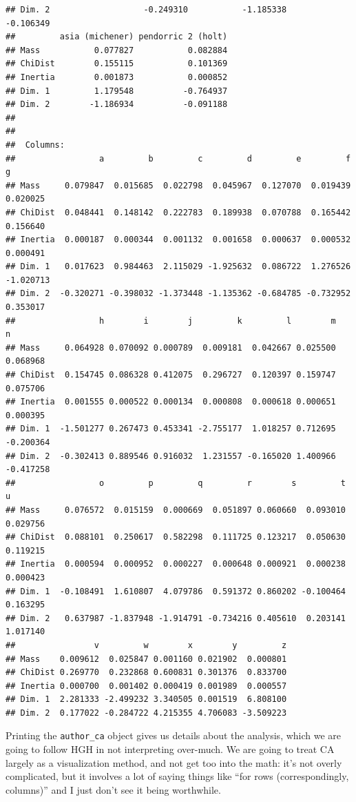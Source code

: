 \documentclass[
]{book}
\begin{document}
\begin{verbatim}
## Dim. 2                   -0.249310           -1.185338          -0.106349
##         asia (michener) pendorric 2 (holt)
## Mass           0.077827           0.082884
## ChiDist        0.155115           0.101369
## Inertia        0.001873           0.000852
## Dim. 1         1.179548          -0.764937
## Dim. 2        -1.186934          -0.091188
## 
## 
##  Columns:
##                 a         b         c         d         e         f         g
## Mass     0.079847  0.015685  0.022798  0.045967  0.127070  0.019439  0.020025
## ChiDist  0.048441  0.148142  0.222783  0.189938  0.070788  0.165442  0.156640
## Inertia  0.000187  0.000344  0.001132  0.001658  0.000637  0.000532  0.000491
## Dim. 1   0.017623  0.984463  2.115029 -1.925632  0.086722  1.276526 -1.020713
## Dim. 2  -0.320271 -0.398032 -1.373448 -1.135362 -0.684785 -0.732952  0.353017
##                 h        i        j         k         l        m         n
## Mass     0.064928 0.070092 0.000789  0.009181  0.042667 0.025500  0.068968
## ChiDist  0.154745 0.086328 0.412075  0.296727  0.120397 0.159747  0.075706
## Inertia  0.001555 0.000522 0.000134  0.000808  0.000618 0.000651  0.000395
## Dim. 1  -1.501277 0.267473 0.453341 -2.755177  1.018257 0.712695 -0.200364
## Dim. 2  -0.302413 0.889546 0.916032  1.231557 -0.165020 1.400966 -0.417258
##                 o         p         q         r        s         t        u
## Mass     0.076572  0.015159  0.000669  0.051897 0.060660  0.093010 0.029756
## ChiDist  0.088101  0.250617  0.582298  0.111725 0.123217  0.050630 0.119215
## Inertia  0.000594  0.000952  0.000227  0.000648 0.000921  0.000238 0.000423
## Dim. 1  -0.108491  1.610807  4.079786  0.591372 0.860202 -0.100464 0.163295
## Dim. 2   0.637987 -1.837948 -1.914791 -0.734216 0.405610  0.203141 1.017140
##                v         w        x        y         z
## Mass    0.009612  0.025847 0.001160 0.021902  0.000801
## ChiDist 0.269770  0.232868 0.600831 0.301376  0.833700
## Inertia 0.000700  0.001402 0.000419 0.001989  0.000557
## Dim. 1  2.281333 -2.499232 3.340505 0.001519  6.808100
## Dim. 2  0.177022 -0.284722 4.215355 4.706083 -3.509223
\end{verbatim}

Printing the \texttt{author\_ca} object gives us details about the analysis, which we are going to follow HGH in not interpreting over-much. We are going to treat CA largely as a visualization method, and not get too into the math: it's not overly complicated, but it involves a lot of saying things like ``for rows (correspondingly, columns)'' and I just don't see it being worthwhile.
\end{document}
